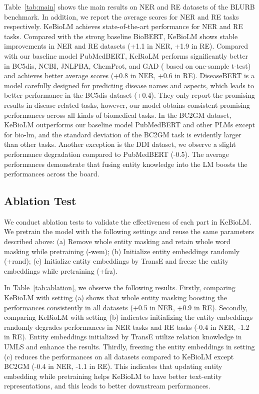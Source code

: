 \documentclass[11pt]{article}
\begin{document}
Table~\ref{tab:main} shows the main results on NER and RE datasets of the BLURB benchmark.
In addition, we report the average scores for NER and RE tasks respectively.
KeBioLM achieves state-of-the-art performance for NER and RE tasks.
Compared with the strong baseline BioBERT, KeBioLM shows stable improvements in NER and RE datasets (+1.1 in NER, +1.9 in RE).
Compared with our baseline model PubMedBERT, KeBioLM performs significantly better in BC5dis, NCBI, JNLPBA, ChemProt, and GAD ( based on one-sample t-test) and achieves better average scores (+0.8 in NER, +0.6 in RE).
DiseaseBERT is a model carefully designed for predicting disease names and aspects, which leads to better performance in the BC5dis dataset (+0.4). They only report the promising results in disease-related tasks, however, our model obtains consistent promising performances across all kinds of biomedical tasks.
In the BC2GM dataset, KeBioLM outperforms our baseline model PubMedBERT and other PLMs except for bio-lm, and the standard deviation of the BC2GM task is evidently larger than other tasks.
Another exception is the DDI dataset, we observe a slight performance degradation compared to PubMedBERT (-0.5).
The average performances demonstrate that fusing entity knowledge into the LM boosts the performances across the board.

\subsection{Ablation Test}
We conduct ablation tests to validate the effectiveness of each part in KeBioLM.
We pretrain the model with the following settings and reuse the same parameters described above:
(a) Remove whole entity masking and retain whole word masking while pretraining (-wem);
(b) Initialize entity embeddings randomly (+rand);
(c) Initialize entity embeddings by TransE and freeze the entity embeddings while pretraining (+frz).

In Table~\ref{tab:ablation}, we observe the following results.
Firstly, comparing KeBioLM with setting (a) shows that whole entity masking boosting the performances consistently in all datasets (+0.5 in NER, +0.9 in RE).
Secondly, comparing KeBioLM with setting (b) indicates initializing the entity embeddings randomly degrades performances in NER tasks and RE tasks (-0.4 in NER, -1.2 in RE).
Entity embeddings initialized by TransE utilize relation knowledge in UMLS and enhance the results. 
Thirdly, freezing the entity embeddings in setting (c) reduces the performances on all datasets compared to KeBioLM except BC2GM (-0.4 in NER, -1.1 in RE).
This indicates that updating entity embedding while pretraining helps KeBioLM to have better text-entity representations, and this leads to better downstream performances.
\end{document}
